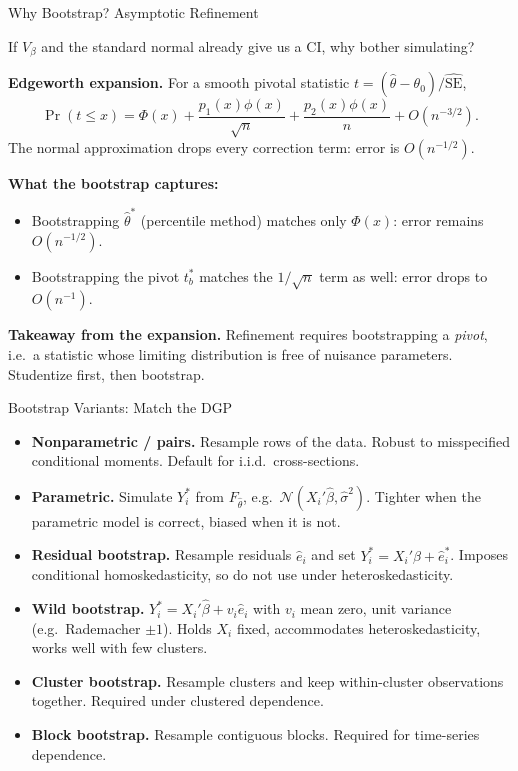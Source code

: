 \documentclass[aspectratio=169, handout]{beamer}
\numberwithin{equation}{section}
\begin{document}
\begin{frame}{Why Bootstrap? Asymptotic Refinement}

If $V_\beta$ and the standard normal already give us a CI, why bother simulating?

\medskip
\textbf{Edgeworth expansion.} For a smooth pivotal statistic $t = (\hat\theta - \theta_0)/\widehat{\text{SE}}$,
$$\Pr(t \le x) = \Phi(x) + \frac{p_1(x)\phi(x)}{\sqrt n} + \frac{p_2(x)\phi(x)}{n} + O(n^{-3/2}).$$
The normal approximation drops every correction term: error is $O(n^{-1/2})$.

\medskip
\textbf{What the bootstrap captures:}
\begin{itemize}
\setlength{\itemsep}{1pt}
\item Bootstrapping $\hat\theta^{*}$ (percentile method) matches only $\Phi(x)$: error remains $O(n^{-1/2})$.
\item Bootstrapping the pivot $t_b^{*}$ matches the $1/\sqrt n$ term as well: error drops to $O(n^{-1})$.
\end{itemize}

\medskip
\textbf{Takeaway from the expansion.} Refinement requires bootstrapping a \textit{pivot}, i.e.\ a statistic whose limiting distribution is free of nuisance parameters. Studentize first, then bootstrap.

\end{frame}

\begin{frame}{Bootstrap Variants: Match the DGP}

\begin{itemize}
\setlength{\itemsep}{4pt}
\item \textbf{Nonparametric / pairs.} Resample rows of the data. Robust to misspecified conditional moments. Default for i.i.d.\ cross-sections.

\item \textbf{Parametric.} Simulate $Y_i^{*}$ from $F_{\hat\theta}$, e.g.\ $\mathcal{N}(X_i'\hat\beta, \hat\sigma^2)$. Tighter when the parametric model is correct, biased when it is not.

\item \textbf{Residual bootstrap.} Resample residuals $\hat e_i$ and set $Y_i^{*} = X_i'\hat\beta + \hat e_i^{*}$. Imposes conditional homoskedasticity, so do not use under heteroskedasticity.

\item \textbf{Wild bootstrap.} $Y_i^{*} = X_i'\hat\beta + v_i \hat e_i$ with $v_i$ mean zero, unit variance (e.g.\ Rademacher $\pm 1$). Holds $X_i$ fixed, accommodates heteroskedasticity, works well with few clusters.

\item \textbf{Cluster bootstrap.} Resample clusters and keep within-cluster observations together. Required under clustered dependence.

\item \textbf{Block bootstrap.} Resample contiguous blocks. Required for time-series dependence.
\end{itemize}

\end{frame}
\end{document}
